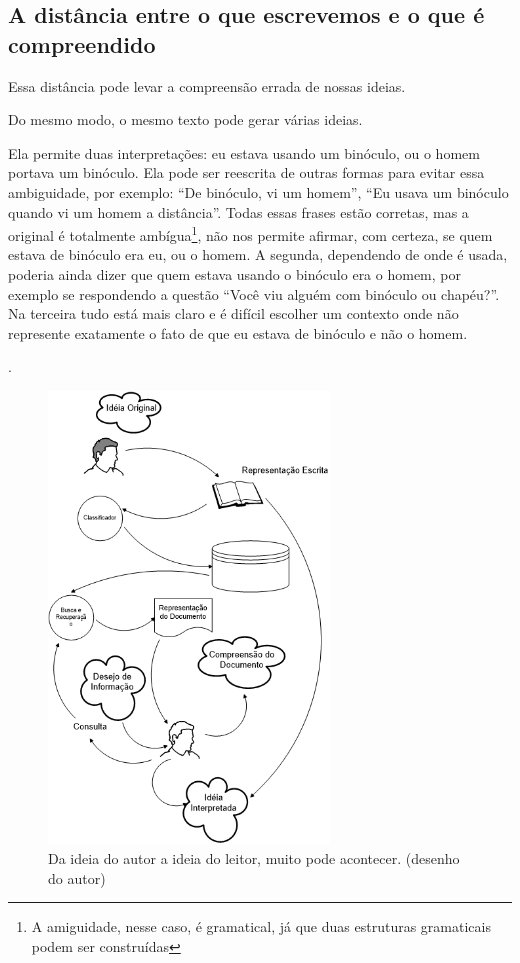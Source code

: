 \documentclass{article}
\begin{document}
\subsection{A distância entre o que escrevemos e o que é compreendido}

 Essa distância pode levar a compreensão errada de nossas ideias. 

 Do mesmo modo, o mesmo texto pode gerar várias ideias.

Ela permite duas interpretações: eu estava usando um binóculo, ou o homem portava um binóculo. Ela pode ser reescrita de outras formas para evitar essa ambiguidade, por exemplo: \enquote{De binóculo, vi um homem}, \enquote{Eu usava um binóculo quando vi um homem a distância}. Todas essas frases estão corretas, mas a original é totalmente ambígua\footnote{A amiguidade, nesse caso, é gramatical, já que duas estruturas gramaticais podem ser construídas}, não nos permite afirmar, com certeza, se quem estava de binóculo era eu, ou o homem. A segunda, dependendo de onde é usada, poderia ainda dizer que quem estava usando o binóculo era o homem, por exemplo se respondendo a questão ``Você viu alguém com binóculo ou chapéu?''. 
Na terceira tudo está mais claro e é difícil escolher um contexto onde não represente exatamente o fato de que eu estava de binóculo e não o homem.

.

\begin{figure}
    \centering
    \includegraphics[height=12cm]{imagens/textretrieval.png}
    \caption{Da ideia do autor a ideia do leitor, muito pode acontecer. (desenho do autor)}
    \label{fig:tr1}
\end{figure}
\end{document}
